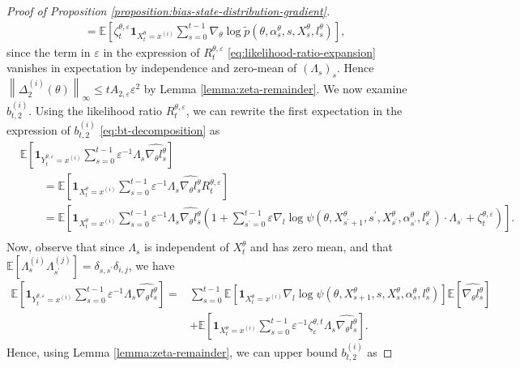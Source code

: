 \documentclass[11pt]{article}
\numberwithin{equation}{section}
\theoremstyle{definition}
\theoremstyle{remark}
\def\eps{\varepsilon}
\begin{document}
\begin{proof}[Proof of Proposition \ref{proposition:bias-state-distribution-gradient}]
\[\begin{aligned}
&= \mathbb E \left[ \zeta_t^{\theta, \eps} \mathbf 1_{X_t^\theta = x^{(i)}} \sum_{s=0}^{t-1} \nabla_\theta \log \tilde p (\theta, \alpha_s^{\theta},s, X_s^\theta, l_s^\theta) \right],
\end{aligned}
\]
since the term in $\eps$ in the expression of $R_t^{\theta, \eps}$ \eqref{eq:likelihood-ratio-expansion} vanishes in expectation by independence and zero-mean of $(\Lambda_s)_s$.
Hence $\left\| \Delta_2^{(i)}(\theta) \right\|_\infty \leq t  A_{2, \eps} \eps^2$ by Lemma \ref{lemma:zeta-remainder}.
We now examine $b_{t,2}^{(i)}$. 
Using the likelihood ratio $R_{t}^{\theta, \eps}$, we can rewrite the first expectation in the expression of $b_{t,2}^{(i)}$ \eqref{eq:bt-decomposition} as
\[
    \begin{aligned}
        &\mathbb E \left[ \mathbf 1_{Y_{t}^{\theta, \eps} = x^{(i)}} \sum_{s=0}^{t-1} \eps^{-1}  \Lambda_s \widehat{\nabla_\theta l_s^\theta}  \right] \\
        &\qquad = \mathbb E \left[ \mathbf 1_{X_t^\theta = x^{(i)}}  \sum_{s=0}^{t-1} \eps^{-1} \Lambda_s \widehat{\nabla_\theta l_s^\theta}   R_{t}^{\theta, \eps}\right] \\
        &\qquad = \mathbb E \left[ \mathbf 1_{X_t^\theta = x^{(i)}} \sum_{s=0}^{t-1} \eps^{-1} \Lambda_s \widehat{\nabla_\theta l_s^\theta}   \left(1 + \sum_{s^\prime = 0}^{t-1} \eps \nabla_l \log \psi(\theta, X^\theta_{s^\prime + 1}, s^\prime,X_{s^\prime}^\theta, \alpha_{s^\prime}^\theta, l_{s^\prime}^\theta) \cdot \Lambda_{s^\prime} + \zeta_t^{\theta, \eps} \right) \right]. \\
    \end{aligned}
\]
Now, observe that since $\Lambda_s$ is independent of $X_t^\theta$ and has zero mean, and that $\mathbb E \left[ \Lambda_s^{(i)} \Lambda_{s^\prime}^{(j)} \right] = \delta_{s,s^\prime} \delta_{i,j}$, we have
\[
\begin{aligned}
 \mathbb E \left[ \mathbf 1_{Y_{t}^{\theta, \eps} = x^{(i)}} \sum_{s=0}^{t-1} \eps^{-1} \Lambda_s \widehat{\nabla_\theta l_s^\theta} \right] =& \sum_{s=0}^{t-1} \mathbb E \left[ \mathbf 1_{X_t^\theta = x^{(i)}} \nabla_l \log \psi(\theta, X^\theta_{s + 1}, s,X_s^\theta, \alpha_s^\theta, l_s^\theta) \right] \mathbb E \left[ \widehat{\nabla_\theta l_s^\theta}  \right]  \\
&+ \mathbb E \left[ \mathbf 1_{X_t^\theta = x^{(i)}} \sum_{s=0}^{t-1} \eps^{-1} \zeta_\eps^{\theta, t} \Lambda_s \widehat{\nabla_\theta l_s^\theta}  \right].
\end{aligned}
\]
Hence, using Lemma \ref{lemma:zeta-remainder}, we can upper bound $b_{t,2}^{(i)}$ as

\end{proof}
\end{document}

